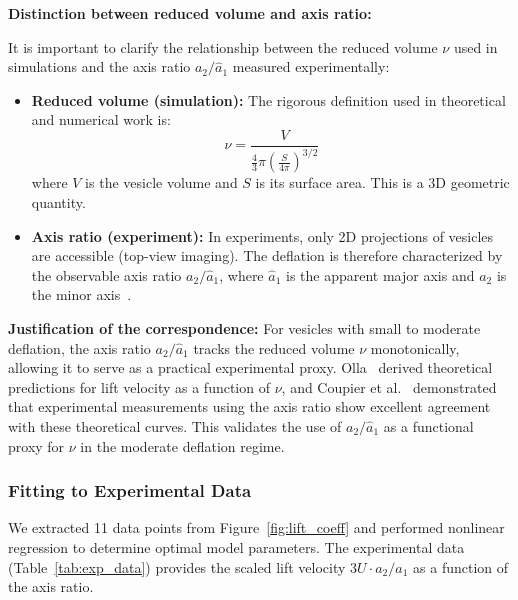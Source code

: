 \documentclass{article}
\begin{document}
\textbf{Distinction between reduced volume and axis ratio:}

It is important to clarify the relationship between the reduced volume $\nu$ used in simulations and the axis ratio $a_2/\hat{a}_1$ measured experimentally:

\begin{itemize}
    \item \textbf{Reduced volume (simulation):} The rigorous definition used in theoretical and numerical work is:
    \begin{equation}
        \nu = \frac{V}{\frac{4}{3}\pi \left(\frac{S}{4\pi}\right)^{3/2}}
        \label{eq:reduced_volume}
    \end{equation}
    where $V$ is the vesicle volume and $S$ is its surface area. This is a 3D geometric quantity.
    
    \item \textbf{Axis ratio (experiment):} In experiments, only 2D projections of vesicles are accessible (top-view imaging). The deflation is therefore characterized by the observable axis ratio $a_2/\hat{a}_1$, where $\hat{a}_1$ is the apparent major axis and $a_2$ is the minor axis~\cite{coupier2009}.
\end{itemize}

\textbf{Justification of the correspondence:} For vesicles with small to moderate deflation, the axis ratio $a_2/\hat{a}_1$ tracks the reduced volume $\nu$ monotonically, allowing it to serve as a practical experimental proxy. Olla~\cite{olla1997} derived theoretical predictions for lift velocity as a function of $\nu$, and Coupier et al.~\cite{coupier2009} demonstrated that experimental measurements using the axis ratio show excellent agreement with these theoretical curves. This validates the use of $a_2/\hat{a}_1$ as a functional proxy for $\nu$ in the moderate deflation regime.

\subsubsection{Fitting to Experimental Data}

We extracted 11 data points from Figure~\ref{fig:lift_coeff} and performed nonlinear regression to determine optimal model parameters. The experimental data (Table~\ref{tab:exp_data}) provides the scaled lift velocity $3U \cdot a_2/\hat{a}_1$ as a function of the axis ratio.
\end{document}
